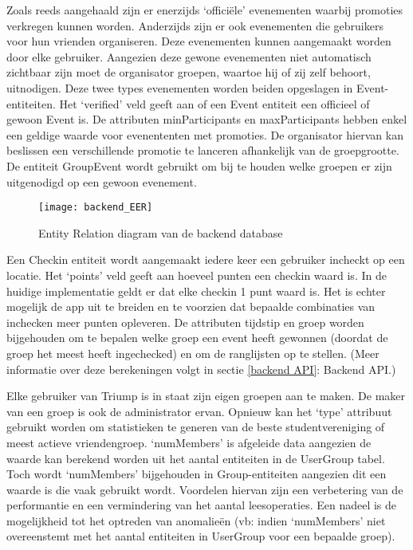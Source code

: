 Zoals reeds aangehaald zijn er enerzijds `officiële' evenementen waarbij promoties verkregen kunnen worden. Anderzijds zijn er ook evenementen die gebruikers voor hun vrienden organiseren. Deze evenementen kunnen aangemaakt worden door elke gebruiker. Aangezien deze gewone evenementen niet automatisch zichtbaar zijn moet de organisator groepen, waartoe hij of zij zelf behoort, uitnodigen. 
Deze twee types evenementen worden beiden opgeslagen in Event-entiteiten. Het `verified' veld geeft aan of een Event entiteit een officieel of gewoon Event is. De attributen minParticipants en maxParticipants hebben enkel een geldige waarde voor evenententen met promoties. De organisator hiervan kan beslissen een verschillende promotie te lanceren afhankelijk van de groepgrootte. De entiteit GroupEvent wordt gebruikt om bij te houden welke groepen er zijn uitgenodigd op een gewoon evenement.


\begin{figure}[H]
	\texttt{[image: backend\_EER]}
	\caption{Entity Relation diagram van de backend database}
	\label{fig:Backend ER}
\end{figure}


Een Checkin entiteit wordt aangemaakt iedere keer een gebruiker incheckt op een locatie. Het `points' veld geeft aan hoeveel punten een checkin waard is. In de huidige implementatie geldt er dat elke checkin 1 punt waard is. Het is echter mogelijk de app uit te breiden en te voorzien dat bepaalde combinaties van inchecken meer punten opleveren. De attributen tijdstip en groep worden bijgehouden om te bepalen welke groep een event heeft gewonnen (doordat de groep het meest heeft ingechecked) en om de ranglijsten op te stellen. (Meer informatie over deze berekeningen volgt in sectie \ref{backend API}: Backend API.)

Elke gebruiker van Triump is in staat zijn eigen groepen aan te maken. De maker van een groep is ook de administrator ervan. Opnieuw kan het `type' attribuut gebruikt worden om statistieken te generen van de beste studentvereniging of meest actieve vriendengroep. `numMembers' is afgeleide data aangezien de waarde kan berekend worden uit het aantal entiteiten in de UserGroup tabel. Toch wordt `numMembers' bijgehouden in Group-entiteiten aangezien dit een waarde is die vaak gebruikt wordt. Voordelen hiervan zijn een verbetering van de performantie en een vermindering van het aantal leesoperaties. Een nadeel is de mogelijkheid tot het optreden van anomalieën (vb: indien `numMembers' niet overeenstemt met het aantal entiteiten in UserGroup voor een bepaalde groep).

